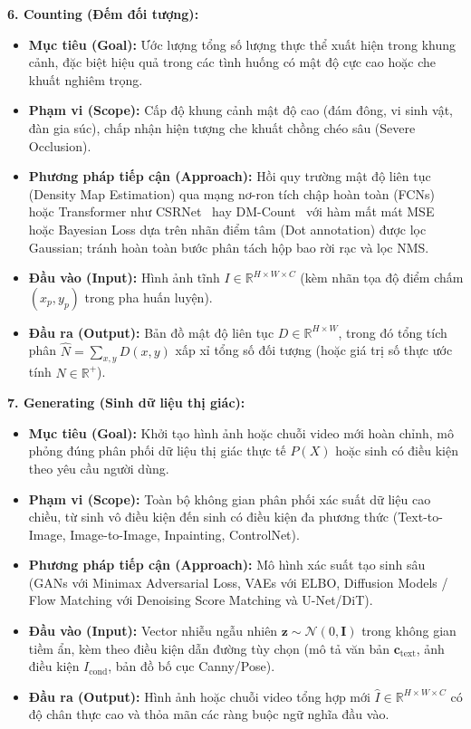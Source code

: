 \textbf{6. Counting (Đếm đối tượng):}
\begin{itemize}
    \item \textbf{Mục tiêu (Goal):} Ước lượng tổng số lượng thực thể xuất hiện trong khung cảnh, đặc biệt hiệu quả trong các tình huống có mật độ cực cao hoặc che khuất nghiêm trọng.
    \item \textbf{Phạm vi (Scope):} Cấp độ khung cảnh mật độ cao (đám đông, vi sinh vật, đàn gia súc), chấp nhận hiện tượng che khuất chồng chéo sâu (Severe Occlusion).
    \item \textbf{Phương pháp tiếp cận (Approach):} Hồi quy trường mật độ liên tục (Density Map Estimation) qua mạng nơ-ron tích chập hoàn toàn (FCNs) hoặc Transformer như CSRNet~\citep{li2018csrnet} hay DM-Count~\citep{wang2020distribution} với hàm mất mát MSE hoặc Bayesian Loss dựa trên nhãn điểm tâm (Dot annotation) được lọc Gaussian; tránh hoàn toàn bước phân tách hộp bao rời rạc và lọc NMS.
    \item \textbf{Đầu vào (Input):} Hình ảnh tĩnh $I \in \mathbb{R}^{H \times W \times C}$ (kèm nhãn tọa độ điểm chấm $(x_p, y_p)$ trong pha huấn luyện).
    \item \textbf{Đầu ra (Output):} Bản đồ mật độ liên tục $D \in \mathbb{R}^{H \times W}$, trong đó tổng tích phân $\hat{N} = \sum_{x,y} D(x, y)$ xấp xỉ tổng số đối tượng (hoặc giá trị số thực ước tính $\hat{N} \in \mathbb{R}^+$).
\end{itemize}

\textbf{7. Generating (Sinh dữ liệu thị giác):}
\begin{itemize}
    \item \textbf{Mục tiêu (Goal):} Khởi tạo hình ảnh hoặc chuỗi video mới hoàn chỉnh, mô phỏng đúng phân phối dữ liệu thị giác thực tế $P(X)$ hoặc sinh có điều kiện theo yêu cầu người dùng.
    \item \textbf{Phạm vi (Scope):} Toàn bộ không gian phân phối xác suất dữ liệu cao chiều, từ sinh vô điều kiện đến sinh có điều kiện đa phương thức (Text-to-Image, Image-to-Image, Inpainting, ControlNet).
    \item \textbf{Phương pháp tiếp cận (Approach):} Mô hình xác suất tạo sinh sâu (GANs với Minimax Adversarial Loss, VAEs với ELBO, Diffusion Models / Flow Matching với Denoising Score Matching và U-Net/DiT).
    \item \textbf{Đầu vào (Input):} Vector nhiễu ngẫu nhiên $\mathbf{z} \sim \mathcal{N}(0, \mathbf{I})$ trong không gian tiềm ẩn, kèm theo điều kiện dẫn đường tùy chọn (mô tả văn bản $\mathbf{c}_{\text{text}}$, ảnh điều kiện $I_{\text{cond}}$, bản đồ bố cục Canny/Pose).
    \item \textbf{Đầu ra (Output):} Hình ảnh hoặc chuỗi video tổng hợp mới $\hat{I} \in \mathbb{R}^{H \times W \times C}$ có độ chân thực cao và thỏa mãn các ràng buộc ngữ nghĩa đầu vào.
\end{itemize}

